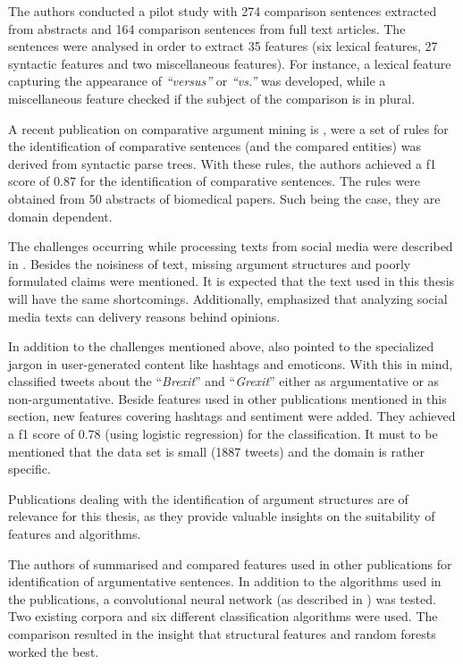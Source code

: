 The authors conducted a pilot study with 274 comparison sentences extracted from abstracts and 164 comparison sentences from full text articles. The sentences were analysed in order to extract 35 features (six lexical features, 27 syntactic features and two miscellaneous features). For instance, a lexical feature capturing the appearance of \emph{\enquote{versus}} or \emph{\enquote{vs.}} was developed, while a miscellaneous feature checked if the subject of the comparison is in plural. 


A recent publication on comparative argument mining is \cite{gupta2017identifying}, were a set of rules for the identification of comparative sentences (and the compared entities) was derived from syntactic parse trees. With these rules, the authors achieved a f1 score of 0.87 for the identification of comparative sentences. The rules were obtained from 50 abstracts of biomedical papers. Such being the case, they are domain dependent.\newline

The challenges occurring while processing texts from social media were described in \cite{Snajder2017Social-Media-Ar}. Besides the noisiness of text, missing argument structures and poorly formulated claims were mentioned. It is expected that the text used in this thesis will have the same shortcomings. Additionally, \cite{Snajder2017Social-Media-Ar} emphasized that analyzing social media texts can delivery reasons behind opinions.

In addition to the challenges mentioned above, \cite{Dusmanu2017Argument-Mining} also pointed to the specialized jargon in user-generated content like hashtags and emoticons. With this in mind, \cite{Dusmanu2017Argument-Mining} classified tweets about the \enquote{\emph{Brexit}} and \enquote{\emph{Grexit}} either as argumentative or as non-argumentative. Beside features used in other publications mentioned in this section, new features covering hashtags and sentiment were added. They achieved a f1 score of 0.78 (using logistic regression) for the classification. It must to be mentioned that the data set is small (1887 tweets) and the domain is rather specific.\newline

Publications dealing with the identification of argument structures are of relevance for this thesis, as they provide valuable insights on the suitability of features and algorithms.

The authors of \cite{Aker2017What-works-and-} summarised and compared features used in other publications for identification of argumentative sentences. In addition to the algorithms used in the publications, a convolutional neural network (as described in \cite{Kim2014Convolutional-N}) was tested. Two existing corpora and six different classification algorithms were used. The comparison resulted in the insight that structural features and random forests worked the best.

